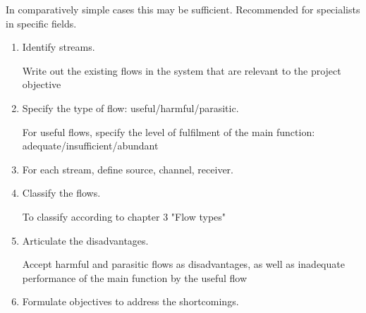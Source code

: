\documentclass[a4paper,11pt]{article}
\begin{document}
In comparatively simple cases this may be sufficient. Recommended for
specialists in specific fields.
\begin{enumerate}
\item Identify streams.

  Write out the existing flows in the system that are relevant to the project
  objective

\item Specify the type of flow: useful/harmful/parasitic.

For useful flows, specify the level of fulfilment of the main function:
adequate/insufficient/abundant

\item For each stream, define source, channel, receiver.

\item Classify the flows.

  To classify according to chapter 3 "Flow types"

\item Articulate the disadvantages.

  Accept harmful and parasitic flows as disadvantages, as well as inadequate
  performance of the main function by the useful flow

\item Formulate objectives to address the shortcomings.
\end{enumerate}
\end{document}
